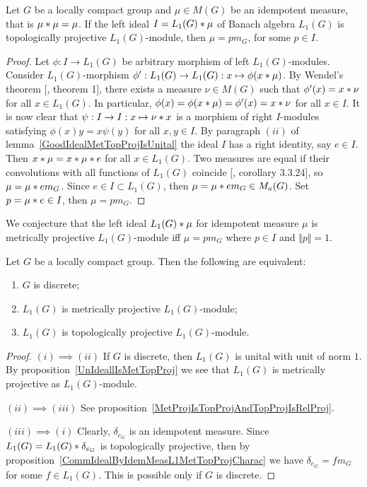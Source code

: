 \begin{proposition}\label{CommIdealByIdemMeasL1MetTopProjCharac} Let $G$ be a
locally compact group and  $\mu\in M(G)$ be an idempotent measure, that is
$\mu\ast\mu=\mu$. If the left ideal $I=L_1(G)\ast\mu$ of Banach algebra
$L_1(G)$ is topologically projective $L_1(G)$-module, then $\mu=p m_G$, for some
$p\in I$.
\end{proposition}
\begin{proof} Let $\phi:I\to L_1(G)$ be arbitrary morphism of left
$L_1(G)$-modules. Consider $L_1(G)$-morphism $\phi':L_1(G)\to
L_1(G):x\mapsto\phi(x\ast\mu)$. By Wendel's theorem [\cite{WendLeftCentrzrs},
theorem 1], there exists a measure $\nu\in M(G)$ such that
$\phi'(x)=x\ast\nu$ for all $x\in L_1(G)$. In particular,
$\phi(x)=\phi(x\ast\mu)=\phi'(x)=x\ast\nu$ for all $x\in I$. It is now
clear that $\psi:I\to I:x\mapsto\nu\ast x$ is a morphism of right $I$-modules
satisfying $\phi(x)y=x\psi(y)$ for all $x,y\in I$. By paragraph $(ii)$ of
lemma~\ref{GoodIdealMetTopProjIsUnital} the ideal $I$ has a right identity, say
$e\in I$. Then $x\ast\mu=x\ast\mu\ast e$ for all $x\in L_1(G)$. Two
measures are equal if their convolutions with all functions of $L_1(G)$ coincide
[\cite{DalBanAlgAutCont}, corollary 3.3.24], so $\mu=\mu\ast e m_G$. Since
$e\in I\subset L_1(G)$, then $\mu=\mu\ast e m_G\in M_a(G)$. 
Set $p=\mu\ast e\in I$, then $\mu=p m_G$.
\end{proof}

We conjecture that the left ideal $L_1(G)\ast \mu$ for idempotent measure
$\mu$ is metrically projective $L_1(G)$-module iff $\mu=p m_G$ where $p\in I$
and $\Vert p\Vert=1$.

\begin{theorem}\label{L1ModL1MetTopProjCharac} Let $G$ be a locally compact
group. Then the following are equivalent:

\begin{enumerate}[label = (\roman*)]
    \item $G$ is discrete;

    \item $L_1(G)$ is metrically projective $L_1(G)$-module;

    \item $L_1(G)$ is topologically projective $L_1(G)$-module.
\end{enumerate}
\end{theorem}
\begin{proof} $(i)\implies (ii)$ If $G$ is discrete, then $L_1(G)$ is unital
with unit of norm $1$. By  proposition~\ref{UnIdeallIsMetTopProj} we see that
$L_1(G)$ is metrically projective as $L_1(G)$-module.

$(ii)\implies (iii)$ See
proposition~\ref{MetProjIsTopProjAndTopProjIsRelProj}.

$(iii) \implies (i)$ Clearly, $\delta_{e_G}$ is an idempotent measure. Since
$L_1(G)=L_1(G)\ast \delta_{e_G}$ is topologically projective, then by
proposition~\ref{CommIdealByIdemMeasL1MetTopProjCharac} 
we have $\delta_{e_G}=f m_G$ for some $f\in L_1(G)$. This is possible only 
if $G$ is discrete.
\end{proof}

